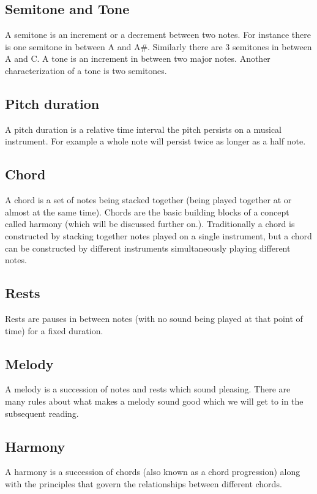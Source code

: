 \subsection{Semitone and Tone}
\noindent A semitone is an increment or a decrement between two notes. For instance there is one semitone in between A and A\#. Similarly there are 3 semitones in between A and C. A tone is an increment in between two major notes. Another characterization of a tone is two semitones.

\subsection{Pitch duration}

\noindent A pitch duration is a relative time interval the pitch persists on a musical instrument. For example a whole note will persist twice as longer as a half note. 

\subsection*{Chord}
\noindent A chord is a set of notes being stacked together (being played together at or almost at the same time). Chords are the basic building blocks of a concept called harmony (which will be discussed further on.). Traditionally a chord is constructed by stacking together notes played on a single instrument, but a chord can be constructed by different instruments simultaneously playing different notes. 

\subsection{Rests}
\noindent Rests are pauses in between notes (with no sound being played at that point of time) for a fixed duration.

\subsection{Melody}
\noindent A melody is a succession of notes and rests which sound pleasing. There are many rules about what makes a melody sound good which we will get to in the subsequent reading.

\subsection{Harmony}
\noindent A harmony is a succession of chords (also known as a chord progression) along with the principles that govern the relationships between different chords. 

